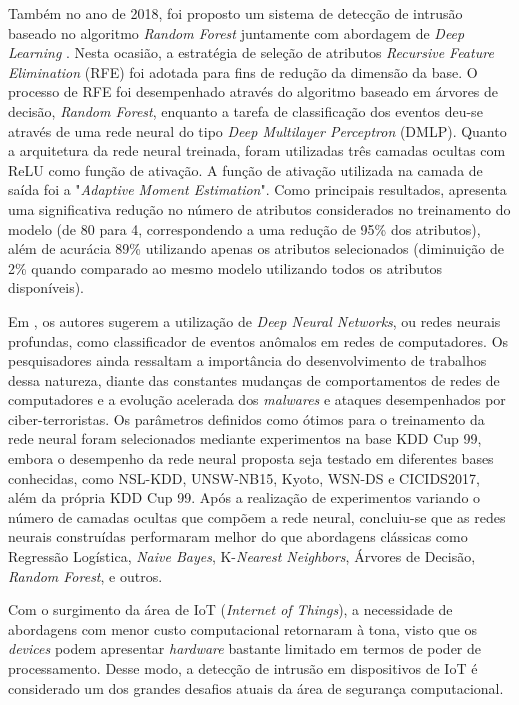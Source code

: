 Também no ano de 2018, foi proposto um sistema de detecção de intrusão baseado no algoritmo \textit{Random Forest} juntamente com abordagem de \textit{Deep Learning} \cite{ustebay2018}. Nesta ocasião, a estratégia de seleção de atributos \textit{Recursive Feature Elimination} (RFE) foi adotada para fins de redução da dimensão da base. O processo de RFE foi desempenhado através do algoritmo baseado em árvores de decisão, \textit{Random Forest}, enquanto a tarefa de classificação dos eventos deu-se através de uma rede neural do tipo \textit{Deep Multilayer Perceptron} (DMLP). Quanto a arquitetura da rede neural treinada, foram utilizadas três camadas ocultas com ReLU como função de ativação. A função de ativação utilizada na camada de saída foi a "\textit{Adaptive Moment Estimation}". Como principais resultados,  apresenta uma significativa redução no número de atributos considerados no treinamento do modelo (de 80 para 4, correspondendo a uma redução de 95\% dos atributos), além de acurácia 89\% utilizando apenas os atributos selecionados (diminuição de 2\% quando comparado ao mesmo modelo utilizando todos os atributos disponíveis).

Em , os autores sugerem a utilização de \textit{Deep Neural Networks}, ou redes neurais profundas, como classificador de eventos anômalos em redes de computadores. Os pesquisadores ainda ressaltam a importância do desenvolvimento de trabalhos dessa natureza, diante das constantes mudanças de comportamentos de redes de computadores e a evolução acelerada dos \textit{malwares} e ataques desempenhados por ciber-terroristas. Os parâmetros definidos como ótimos para o treinamento da rede neural foram selecionados mediante experimentos na base KDD Cup 99, embora o desempenho da rede neural proposta seja testado em diferentes bases conhecidas, como NSL-KDD, UNSW-NB15, Kyoto, WSN-DS e CICIDS2017, além da própria KDD Cup 99. Após a realização de experimentos variando o número de camadas ocultas que compõem a rede neural, concluiu-se que as redes neurais construídas performaram melhor do que abordagens clássicas como Regressão Logística, \textit{Naive Bayes}, K-\textit{Nearest Neighbors}, Árvores de Decisão, \textit{Random Forest}, e outros.

Com o surgimento da área de IoT (\textit{Internet of Things}), a necessidade de abordagens com menor custo computacional retornaram à tona, visto que os \textit{devices} podem apresentar \textit{hardware} bastante limitado em termos de poder de processamento. Desse modo, a detecção de intrusão em dispositivos de IoT é considerado um dos grandes desafios atuais da área de segurança computacional.

